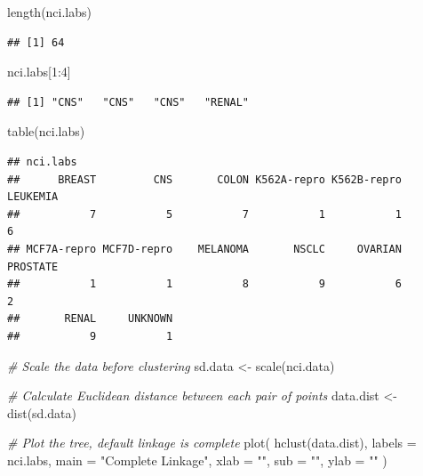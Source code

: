 \documentclass[
]{article}
\newenvironment{Shaded}{\begin{snugshade}}{\end{snugshade}}
\newcommand{\AttributeTok}[1]{\textcolor[rgb]{0.77,0.63,0.00}{#1}}
\newcommand{\CommentTok}[1]{\textcolor[rgb]{0.56,0.35,0.01}{\textit{#1}}}
\newcommand{\DecValTok}[1]{\textcolor[rgb]{0.00,0.00,0.81}{#1}}
\newcommand{\FunctionTok}[1]{\textcolor[rgb]{0.00,0.00,0.00}{#1}}
\newcommand{\NormalTok}[1]{#1}
\newcommand{\OtherTok}[1]{\textcolor[rgb]{0.56,0.35,0.01}{#1}}
\newcommand{\SpecialCharTok}[1]{\textcolor[rgb]{0.00,0.00,0.00}{#1}}
\newcommand{\StringTok}[1]{\textcolor[rgb]{0.31,0.60,0.02}{#1}}
\begin{document}
\begin{Shaded}
\begin{Highlighting}[]
\FunctionTok{length}\NormalTok{(nci.labs)}
\end{Highlighting}
\end{Shaded}

\begin{verbatim}
## [1] 64
\end{verbatim}

\begin{Shaded}
\begin{Highlighting}[]
\NormalTok{nci.labs[}\DecValTok{1}\SpecialCharTok{:}\DecValTok{4}\NormalTok{]}
\end{Highlighting}
\end{Shaded}

\begin{verbatim}
## [1] "CNS"   "CNS"   "CNS"   "RENAL"
\end{verbatim}

\begin{Shaded}
\begin{Highlighting}[]
\FunctionTok{table}\NormalTok{(nci.labs)}
\end{Highlighting}
\end{Shaded}

\begin{verbatim}
## nci.labs
##      BREAST         CNS       COLON K562A-repro K562B-repro    LEUKEMIA 
##           7           5           7           1           1           6 
## MCF7A-repro MCF7D-repro    MELANOMA       NSCLC     OVARIAN    PROSTATE 
##           1           1           8           9           6           2 
##       RENAL     UNKNOWN 
##           9           1
\end{verbatim}

\begin{Shaded}
\begin{Highlighting}[]
\CommentTok{\# Scale the data before clustering}
\NormalTok{sd.data }\OtherTok{\textless{}{-}} \FunctionTok{scale}\NormalTok{(nci.data)}

\CommentTok{\# Calculate Euclidean distance between each pair of points}
\NormalTok{data.dist }\OtherTok{\textless{}{-}} \FunctionTok{dist}\NormalTok{(sd.data)}

\CommentTok{\# Plot the tree, default linkage is \textquotesingle{}complete\textquotesingle{}}
\FunctionTok{plot}\NormalTok{(}
  \FunctionTok{hclust}\NormalTok{(data.dist),}
  \AttributeTok{labels =}\NormalTok{ nci.labs,}
  \AttributeTok{main =} \StringTok{"Complete Linkage"}\NormalTok{,}
  \AttributeTok{xlab =} \StringTok{""}\NormalTok{,}
  \AttributeTok{sub =} \StringTok{""}\NormalTok{,}
  \AttributeTok{ylab =} \StringTok{""}
\NormalTok{)}
\end{Highlighting}
\end{Shaded}
\end{document}

